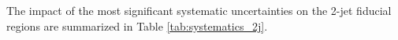 



The impact of the most significant systematic uncertainties on the 2-jet fiducial regions are summarized in Table \ref{tab:systematics_2j}. 

